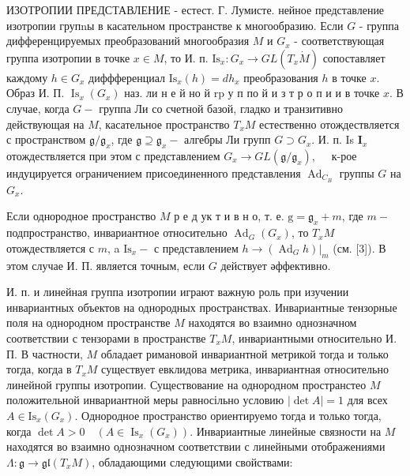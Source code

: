 \documentclass[10pt]{article}
\begin{document}
ИЗОТРОПИИ ПРЕДСТАВЛЕНИЕ - естест. Г. Лумисте. нейное представление изотропии групnы в касательном пространстве к многообразию. Если $G$ - группа дифференцируемых преобразований многообразия $M$ и $G_{x}$ - соответствующая группа изотропии в точке $x \in M$, то $И$. п. $\mathrm{Is}_{x}: G_{x} \rightarrow G L\left(T_{x} \dot{M}\right)$ сопоставляет каждому $h \in G_{x}$ диффференциал $\mathrm{Is}_{x}(h)=d h_{x}$ преобразования $h$ в точке $x$. Образ И. П. $\operatorname{Is}_{x}\left(G_{x}\right)$ наз. ли н е й но й $\mathrm{r} \mathrm{p}$ у п по й и з т р о п и и в точке $x$. В случае, когда $G-$ группа Ли со счетной базой, гладко и транзитивно действующая на $M$, касательное пространство $T_{x} M$ естественно отождествляется с пространством $\mathfrak{g} / \mathfrak{g}_{x}$, где $\mathfrak{g} \supseteq \mathfrak{g}_{x}-$ алгебры Ли групп $G \supset G_{x}$. И. п. Is $\boldsymbol{I}_{x}$ отождествляется при этом с представлением $G_{x} \rightarrow G L\left(\mathfrak{g} / \mathfrak{g}_{x}\right), \quad$ к-рое индуцируется ограничением присоединенного представления $\operatorname{Ad}_{C_{B}}$ группы $G$ на $G_{x}$.



Если однородное пространство $M$ р е д ук т и в н о, т. е. $\mathrm{g}=\mathfrak{g}_{x}+m$, где $m-$ подпространство, инвариантное относительно $\operatorname{Ad}_{G}\left(G_{x}\right)$, то $T_{x} M$ отождествляется с $m$, a $\mathrm{Is}_{x}-$ с представлением $\left.h \rightarrow\left(\operatorname{Ad}_{G} h\right)\right|_{m}$ (см. [3]). В этом случае И. П. является точным, если $G$ действует әффективно.



И. п. и линейная группа изотропии играют важную роль при изучении инвариантных объектов на однородных пространствах. Инвариантные тензорные поля на однородном пространстве $M$ находятся во взаимно однозначном соответствии с тензорами в пространстве $T_{x} M$, инвариантными относительно И. П. В частности, $M$ обладает римановой инвариантной метрикой тогда и только тогда, когда в $T_{x} M$ существует евклидова метрика, инвариантная относительно линейной группы изотропии. Существование на однородном пространстео $M$ положительной инвариантной меры равносільно условию $|\operatorname{det} A|=1$ для всех $A \in \mathrm{Is}_{x}\left(G_{x}\right)$. Однородное пространство ориентируемо тогда и только тогда, когда $\operatorname{det} A>0 \quad\left(A \in \operatorname{Is}_{x}\left(G_{x}\right)\right)$. Инвариантные линейные связности на $M$ находятся во взаимно однозначном соответствии с линейными отображениями $\Lambda: \mathfrak{g} \rightarrow \mathfrak{g} \mathfrak{l}\left(T_{x} M\right)$, обладающими следующими свойствами:
\end{document}
